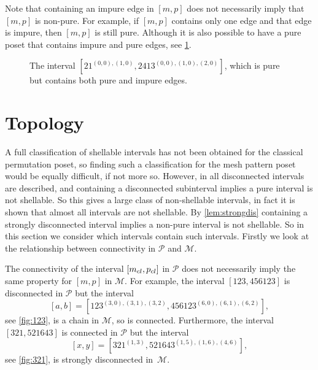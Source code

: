 \documentclass[11pt,a4paper,oneside]{article}
\begin{document}
Note that containing an impure edge in $[m,p]$ does not necessarily imply
that $[m,p]$ is non-pure. For example, if $[m,p]$ contains only one edge and
that edge is impure, then $[m,p]$ is still pure. Although it is also possible
to have a pure poset that contains impure and pure edges, see \cref{fig:pureIm}.

\begin{figure}\centering
{}
\caption{The interval $[21^{(0,0),(1,0)},2413^{(0,0),(1,0),(2,0)}]$,
 which is pure but contains both pure and impure edges.}
 \label{fig:pureIm}
\end{figure}

\section{Topology}\label{sec:topology}
A full classification of shellable intervals has not been obtained for the classical permutation
poset, so finding such a classification for the mesh pattern poset would be equally difficult, if not more so.
However, in \cite{McSt13} all disconnected intervals are described, and containing a disconnected subinterval
implies a pure interval is not shellable. So this gives a large class of non-shellable intervals, in fact
it is shown that almost all intervals are not shellable. By \cref{lem:strongdis} containing a strongly
disconnected interval implies a non-pure interval is not shellable. So in this section we consider
which intervals contain such intervals. Firstly we look at the relationship between connectivity
in $\mathcal{P}$ and $\mathcal{M}$.

The connectivity of the interval $[m_{cl},p_{cl}]$ in $\mathcal{P}$ does
not necessarily imply the same property for $[m,p]$ in $\mathcal{M}$.
For example, the interval $[123,456123]$ is disconnected in $\mathcal{P}$ but the
interval $$[a,b]=[123^{(3,0),(3,1),(3,2)},456123^{(6,0),(6,1),(6,2)}],$$ see
\cref{fig:123}, is a chain in $\mathcal{M}$, so is connected. Furthermore, the interval
$[321,521643]$ is connected in $\mathcal{P}$ but the interval
$$[x,y]=[321^{(1, 3)},521643^{(1, 5),(1, 6), (4, 6)}],$$ see \cref{fig:321}, is strongly
disconnected in~$\mathcal{M}$.
\end{document}
